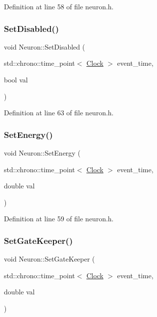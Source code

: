Definition at line 58 of file neuron.\+h.

\mbox{\label{class_neuron_af9ad96e27f7692e9e328d90e4c96977a}} 
\subsubsection{\texorpdfstring{Set\+Disabled()}{SetDisabled()}}
{\footnotesize\ttfamily void Neuron\+::\+Set\+Disabled (\begin{DoxyParamCaption}\item[{std\+::chrono\+::time\+\_\+point$<$ \hyperlink{universe_8h_a0ef8d951d1ca5ab3cfaf7ab4c7a6fd80}{Clock} $>$}]{event\+\_\+time,  }\item[{bool}]{val }\end{DoxyParamCaption})\hspace{0.3cm}{\ttfamily [inline]}}



Definition at line 63 of file neuron.\+h.

\mbox{\label{class_neuron_a5efa690ce4d8ff2f8dfb1fbfd84c5279}} 
\subsubsection{\texorpdfstring{Set\+Energy()}{SetEnergy()}}
{\footnotesize\ttfamily void Neuron\+::\+Set\+Energy (\begin{DoxyParamCaption}\item[{std\+::chrono\+::time\+\_\+point$<$ \hyperlink{universe_8h_a0ef8d951d1ca5ab3cfaf7ab4c7a6fd80}{Clock} $>$}]{event\+\_\+time,  }\item[{double}]{val }\end{DoxyParamCaption})\hspace{0.3cm}{\ttfamily [inline]}}



Definition at line 59 of file neuron.\+h.

\mbox{\label{class_neuron_a492f597021faf1b74942bc75364c3c22}} 
\subsubsection{\texorpdfstring{Set\+Gate\+Keeper()}{SetGateKeeper()}}
{\footnotesize\ttfamily void Neuron\+::\+Set\+Gate\+Keeper (\begin{DoxyParamCaption}\item[{std\+::chrono\+::time\+\_\+point$<$ \hyperlink{universe_8h_a0ef8d951d1ca5ab3cfaf7ab4c7a6fd80}{Clock} $>$}]{event\+\_\+time,  }\item[{double}]{val }\end{DoxyParamCaption})\hspace{0.3cm}{\ttfamily [inline]}}




